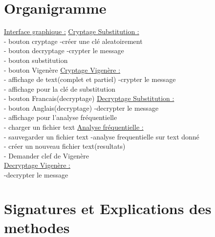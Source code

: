\documentclass[a4]{article}
\begin{document}
	\section{Organigramme}
			\underline{Interface graphique :}     \hspace{5cm}  \underline{Cryptage Substitution :}\\
			- bouton cryptage            \hspace{5.5cm}       -créer une clé aleatoirement\\
			- bouton decryptage         \hspace{5cm}        -crypter le message\\
			- bouton substitution\\
			- bouton Vigenère           \hspace{5.2cm}       \underline{Cryptage Vigenère :}\\
			- affichage de text(complet et partiel)  \hspace{2.2cm} -crypter le message\\
			- affichage pour la clé de substitution\\
			- bouton Francais(decryptage)   \hspace{3.5cm}     \underline{Decryptage Substitution :}\\
			- bouton Anglais(decryptage)    \hspace{3.5cm}     -decrypter le message\\
			- affichage pour l'analyse fréquentielle\\
			- charger un fichier text       \hspace{4.2cm}  \underline{Analyse fréquentielle :}\\
			- sauvegarder un fichier text     \hspace{3.8cm}  -analyse frequentielle sur text donné\\
			- créer un nouveau fichier text(resultats)\\
			- Demander clef de Vigenère\\
			
			
			\underline{Decryptage Vigenère :}\\
			-decrypter le message\\
			

			
			
			
	\section{Signatures et Explications des methodes}
\end{document}
